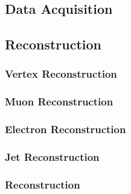 \subsection{Data Acquisition}
\subsection{Reconstruction}
\subsubsection{Vertex Reconstruction}
\subsubsection{Muon Reconstruction}
\subsubsection{Electron Reconstruction}
\subsubsection{Jet Reconstruction}
\subsubsection{\met Reconstruction}

